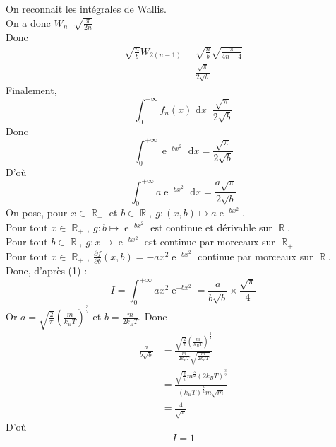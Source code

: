 \documentclass{article}
\newcommand{\dint}[1]{\text{ d}#1}
\DeclareMathOperator{\e}{\mathrm{e}}
\DeclareMathOperator{\simp}{\underset{+\infty}{\sim}}
\DeclareMathOperator{\R}{\mathbb{R}}
\begin{document}
On reconnait les intégrales de Wallis. \\
On a donc $W_{n}\simp\sqrt{\frac{\pi}{2n}}$ \\
Donc
\begin{align*}
    \sqrt{\frac{n}{b}}W_{2(n-1)}&\simp\sqrt{\frac{n}{b}}\sqrt{\frac{\pi}{4n-4}} \\
    &\simp \frac{\sqrt{\pi}}{2\sqrt{b}}
\end{align*}
Finalement,
\[ \int_0^{+\infty}f_n(x)\dint{x}\simp\frac{\sqrt{\pi}}{2\sqrt{b}} \]
Donc
\[ \int_0^{+\infty}\e^{-bx^2}\dint{x} = \frac{\sqrt{\pi}}{2\sqrt{b}} \]
D'où
\[ \int_0^{+\infty}a\e^{-bx^2}\dint{x} = \frac{a\sqrt{\pi}}{2\sqrt{b}} \tag{1} \]
On pose, pour $x\in\R_+$ et $b\in\R,\ g:(x,b)\mapsto a\e^{-bx^2}$. \\
Pour tout $x\in\R_+,\ g:b\mapsto\e^{-bx^2}$ est continue et dérivable sur $\R$. \\
Pour tout $b\in\R,\ g:x\mapsto\e^{-bx^2}$ est continue par morceaux sur $\R_+$ \\
Pour tout $x\in\R_+,\ \displaystyle\frac{\partial f}{\partial b}(x, b) = -ax^2\e^{-bx^2}$ continue par morceaux sur $\R$. \\
Donc, d'après (1) :
\[ I = \int_0^{+\infty}ax^2\e^{-bx^2} = \frac{a}{b\sqrt{b}}\times\frac{\sqrt{\pi}}{4} \]
Or $\displaystyle a=\sqrt{\frac{2}{\pi}}\left(\frac{m}{k_BT}\right)^\frac{3}{2}$ et $\displaystyle b=\frac{m}{2k_BT}$. Donc
\begin{align*}
    \frac{a}{b\sqrt{b}} &= \frac{\sqrt{\frac{2}{\pi}}\left(\frac{m}{k_BT}\right)^\frac{3}{2}}{\frac{m}{2k_BT}\sqrt{\frac{m}{2k_BT}}} \\
    &= \frac{\sqrt{\frac{2}{\pi}}m^{\frac{3}{2}}(2k_BT)^{\frac{3}{2}}}{(k_BT)^{\frac{3}{2}}m\sqrt{m}} \\
    &= \frac{4}{\sqrt{\pi}}
\end{align*}
D'où
\[ \boxed{I = 1} \]
\end{document}
